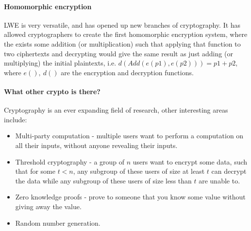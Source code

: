 \paragraph{Homomorphic encryption} LWE is very versatile, and has opened up new branches of cryptography. It has allowed cryptographers to create the first homomorphic encryption system, where the exists some addition (or multiplication) such that applying that function to two ciphertexts and decrypting would give the same result as just adding (or multiplying) the initial plaintexts, i.e. $d(Add(e(p1),e(p2))) = p1 + p2$, where $e(),~d()$ are the encryption and decryption functions. 

\paragraph{What other crypto is there?} Cryptography is an ever expanding field of research, other interesting areas include:
\begin{itemize}
	\item Multi-party computation - multiple users want to perform a computation on all their inputs, without anyone revealing their inputs.
	\item Threshold cryptography - a group of $n$ users want to encrypt some data, such that for some $t<n$, any subgroup of these users of size at least $t$ can decrypt the data while any subgroup of these users of size less than $t$ are unable to.
	\item Zero knowledge proofs - prove to someone that you know some value without giving away the value.
	\item Random number generation.
\end{itemize}


